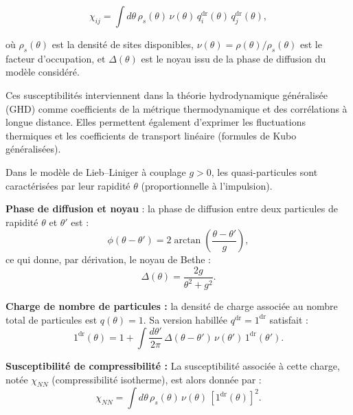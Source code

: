 {\begin{equation}
    \chi_{ij} = \int d\theta\, \rho_s(\theta)\, \nu(\theta)\, q_i^{\mathrm{dr}}(\theta)\, q_j^{\mathrm{dr}}(\theta),
\end{equation}

où $\rho_s(\theta)$ est la densité de sites disponibles, $\nu(\theta) = \rho(\theta)/\rho_s(\theta)$ est le facteur d’occupation, et $\Delta(\theta)$ est le noyau issu de la phase de diffusion du modèle considéré.

Ces susceptibilités interviennent dans la théorie hydrodynamique généralisée (GHD) comme coefficients de la métrique thermodynamique et des corrélations à longue distance. Elles permettent également d’exprimer les fluctuations thermiques et les coefficients de transport linéaire (formules de Kubo généralisées).

\begin{mdframed}[
	linewidth=0.5pt, 
	backgroundcolor=gray!5, 
	roundcorner=50pt,	
	innerleftmargin=5pt,
    innerrightmargin=5pt,
    innertopmargin=5pt,
    innerbottommargin=2pt,
    leftmargin=2pt,
    rightmargin=2pt
	]
	

Dans le modèle de Lieb–Liniger à couplage $g > 0$, les quasi-particules sont caractérisées par leur rapidité $\theta$ (proportionnelle à l’impulsion).

\vspace{1mm}
\textbf{Phase de diffusion et noyau} : la phase de diffusion entre deux particules de rapidité $\theta$ et $\theta'$ est :
\[
\phi(\theta - \theta') = 2 \arctan\left( \frac{\theta - \theta'}{g} \right),
\]
ce qui donne, par dérivation, le noyau de Bethe :
\[
\Delta(\theta) = \frac{2g}{\theta^2 + g^2}.
\]

\vspace{1mm}
\textbf{Charge de nombre de particules :} la densité de charge associée au nombre total de particules est $q(\theta) = 1$. Sa version habillée $q^{\mathrm{dr}} = 1^{\mathrm{dr}}$ satisfait :
\[
1^{\mathrm{dr}}(\theta) = 1 + \int \frac{d\theta'}{2\pi}\, \Delta(\theta - \theta')\, \nu(\theta')\, 1^{\mathrm{dr}}(\theta').
\]

\vspace{1mm}
\textbf{Susceptibilité de compressibilité :}
La susceptibilité associée à cette charge, notée $\chi_{NN}$ (compressibilité isotherme), est alors donnée par :
\[
\chi_{NN} = \int d\theta\, \rho_s(\theta)\, \nu(\theta)\, [1^{\mathrm{dr}}(\theta)]^2.
\]


\end{mdframed}}

